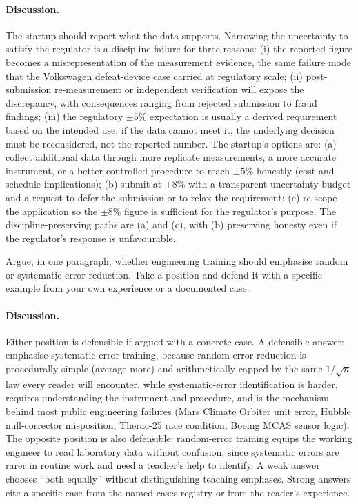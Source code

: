 \paragraph{Discussion.}
The startup should report what the data supports. Narrowing the
uncertainty to satisfy the regulator is a discipline failure for
three reasons: (i) the reported figure becomes a misrepresentation
of the measurement evidence, the same failure mode that the
Volkswagen defeat-device case carried at regulatory scale; (ii)
post-submission re-measurement or independent verification will
expose the discrepancy, with consequences ranging from rejected
submission to fraud findings; (iii) the regulatory $\pm 5\%$
expectation is usually a derived requirement based on the
intended use; if the data cannot meet it, the underlying decision
must be reconsidered, not the reported number. The startup's
options are: (a) collect additional data through more replicate
measurements, a more accurate instrument, or a better-controlled
procedure to reach $\pm 5\%$ honestly (cost and schedule
implications); (b) submit at $\pm 8\%$ with a transparent
uncertainty budget and a request to defer the submission or to
relax the requirement; (c) re-scope the application so the $\pm
8\%$ figure is sufficient for the regulator's purpose. The
discipline-preserving paths are (a) and (c), with (b) preserving
honesty even if the regulator's response is unfavourable.

\begin{exercise}
Argue, in one paragraph, whether engineering training should
emphasise random or systematic error reduction. Take a position
and defend it with a specific example from your own experience or
a documented case.
\end{exercise}

\paragraph{Discussion.}
Either position is defensible if argued with a concrete case.
A defensible answer: emphasise systematic-error training, because
random-error reduction is procedurally simple (average more) and
arithmetically capped by the same $1/\sqrt{n}$ law every reader
will encounter, while systematic-error identification is harder,
requires understanding the instrument and procedure, and is the
mechanism behind most public engineering failures (Mars Climate
Orbiter unit error, Hubble null-corrector misposition, Therac-25
race condition, Boeing MCAS sensor logic). The opposite position
is also defensible: random-error training equips the working
engineer to read laboratory data without confusion, since
systematic errors are rarer in routine work and need a teacher's
help to identify. A weak answer chooses ``both equally'' without
distinguishing teaching emphases. Strong answers cite a specific
case from the named-cases registry or from the reader's
experience.

